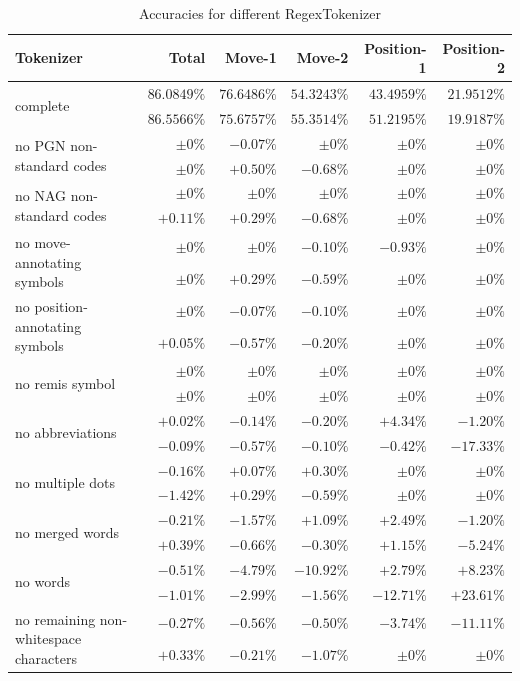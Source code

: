 \documentclass[article,type=msc,colorback,accentcolor=tud7b]{tudthesis}
\begin{document}
	\begin{table}[H]
      \begin{tabular}{| l | r | r | r | r | r |}
    	\hline
    	Tokenizer & Total & Move-1 & Move-2 & Position-1 & Position-2 \\ \hline
	    \multirow{2}{*}{complete} & $86.0849\%$ & $76.6486\%$ & $54.3243\%$ & $43.4959\%$ & $21.9512\%$ \\	
	    & $86.5566\%$ & $75.6757\%$ & $55.3514\%$ & $51.2195\%$ & $19.9187\%$ \\ \hline
	    \multirow{2}{*}{no PGN non-standard codes} & $\pm0\%$ & $-0.07\%$ & $\pm0\%$ & $\pm0\%$ & $\pm0\%$ \\	
	    & $\pm0\%$ & $+0.50\%$ & $-0.68\%$ & $\pm0\%$ & $\pm0\%$ \\ \hline
	    \multirow{2}{*}{no NAG non-standard codes} & $\pm0\%$ & $\pm0\%$ & $\pm0\%$ & $\pm0\%$ & $\pm0\%$ \\	
	    & $+0.11\%$ & $+0.29\%$ & $-0.68\%$ & $\pm0\%$ & $\pm0\%$ \\ \hline
	    \multirow{2}{*}{no move-annotating symbols} & $\pm0\%$ & $\pm0\%$ & $-0.10\%$ & $-0.93\%$ & $\pm0\%$ \\	
	    & $\pm0\%$ & $+0.29\%$ & $-0.59\%$ & $\pm0\%$ & $\pm0\%$ \\ \hline
	    \multirow{2}{*}{no position-annotating symbols} & $\pm0\%$ & $-0.07\%$ & $-0.10\%$ & $\pm0\%$ & $\pm0\%$ \\	
	    & $+0.05\%$ & $-0.57\%$ & $-0.20\%$ & $\pm0\%$ & $\pm0\%$ \\ \hline
	    \multirow{2}{*}{no remis symbol} & $\pm0\%$ & $\pm0\%$ & $\pm0\%$ & $\pm0\%$ & $\pm0\%$ \\	
	    & $\pm0\%$ & $\pm0\%$ & $\pm0\%$ & $\pm0\%$ & $\pm0\%$ \\ \hline
	    \multirow{2}{*}{no abbreviations} & $+0.02\%$ & $-0.14\%$ & $-0.20\%$ & $+4.34\%$ & $-1.20\%$ \\	
	    & $-0.09\%$ & $-0.57\%$ & $-0.10\%$ & $-0.42\%$ & $-17.33\%$ \\ \hline
	    \multirow{2}{*}{no multiple dots} & $-0.16\%$ & $+0.07\%$ & $+0.30\%$ & $\pm0\%$ & $\pm0\%$ \\	
	    & $-1.42\%$ & $+0.29\%$ & $-0.59\%$ & $\pm0\%$ & $\pm0\%$ \\ \hline
	    \multirow{2}{*}{no merged words} & $-0.21\%$ & $-1.57\%$ & $+1.09\%$ & $+2.49\%$ & $-1.20\%$ \\	
	    & $+0.39\%$ & $-0.66\%$ & $-0.30\%$ & $+1.15\%$ & $-5.24\%$ \\ \hline
	    \multirow{2}{*}{no words} & $-0.51\%$ & $-4.79\%$ & $-10.92\%$ & $+2.79\%$ & $+8.23\%$ \\	
	    & $-1.01\%$ & $-2.99\%$ & $-1.56\%$ & $-12.71\%$ & $+23.61\%$ \\ \hline
	    \multirow{2}{*}{no remaining non-whitespace characters} & $-0.27\%$ & $-0.56\%$ & $-0.50\%$ & $-3.74\%$ & $-11.11\%$ \\	
	    & $+0.33\%$ & $-0.21\%$ & $-1.07\%$ & $\pm0\%$ & $\pm0\%$ \\ \hline
      \end{tabular}
      \caption{Accuracies for different RegexTokenizer}
      \label{tab:tokenizer_statistics}
	\end{table}
\end{document}
